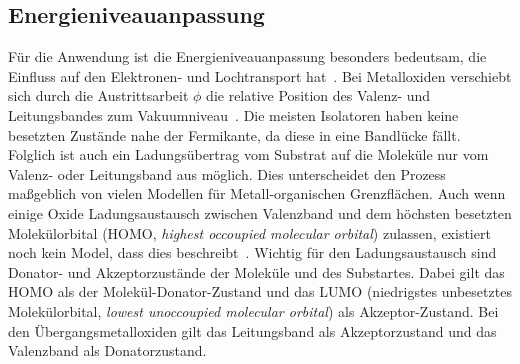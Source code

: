         \subsection{Energieniveauanpassung} \label{sec:ENA}
            Für die Anwendung ist die Energieniveauanpassung besonders bedeutsam, die Einfluss auf den Elektronen- und Lochtransport hat~\cite{IF_4}.
            Bei Metalloxiden verschiebt sich durch die Austrittsarbeit $\phi$ die relative Position des Valenz- und Leitungsbandes zum Vakuumniveau~\cite{IF_3}.
            Die meisten Isolatoren haben keine besetzten Zustände nahe der Fermikante, da diese in eine Bandlücke fällt.
            Folglich ist auch ein Ladungsübertrag vom Substrat auf die Moleküle nur vom Valenz- oder Leitungsband aus möglich.
            Dies unterscheidet den Prozess maßgeblich von vielen Modellen für Metall-organischen Grenzflächen.
            Auch wenn einige Oxide Ladungsaustausch zwischen Valenzband und dem höchsten besetzten Molekülorbital (HOMO, \textit{highest occoupied molecular orbital}) zulassen, existiert noch kein Model, dass dies beschreibt~\cite{IF_3}.
            Wichtig für den Ladungsaustausch sind Donator- und Akzeptorzustände der Moleküle und des Substartes.
            Dabei gilt das HOMO als der Molekül-Donator-Zustand und das LUMO (niedrigstes unbesetztes Molekülorbital, \textit{lowest unoccoupied molecular orbital}) als Akzeptor-Zustand.
            Bei den Übergangsmetalloxiden gilt das Leitungsband als Akzeptorzustand und das Valenzband als Donatorzustand. 

